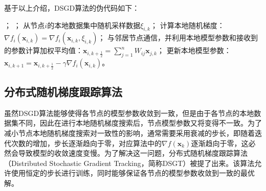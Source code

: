 基于以上介绍，DSGD算法的伪代码如下：
\begin{center}
    \begin{algorithm}[!htbp]
            \caption{节点$i$上的DSGD算法} 
            \label{Algorithm-DSGD} 
            \begin{algorithmic}[1]
            ；
            ；
                \STATE 从节点$i$的本地数据集中随机采样数据$\xi _{i,k} $；
                \STATE 计算本地随机梯度：$\nabla f_i\left( \boldsymbol{x}_{i,k} \right) =\nabla f_i\left( \boldsymbol{x}_{i,k},\xi _{i,k} \right) $；
                \STATE 与邻居节点通信，并利用本地模型参数和接收到的参数计算加权平均值：$\boldsymbol{x}_{i,k+\frac{1}{2}}=\sum_{j=1}^n{W_{ij}\boldsymbol{x}_{j,k}}$；
                \STATE 更新本地模型参数：$\boldsymbol{x}_{i,k+1}=\boldsymbol{x}_{i,k+\frac{1}{2}}-\gamma \nabla f_i\left( \boldsymbol{x}_{i,k} \right) $。
            \ENDFOR            
            \end{algorithmic}
    \end{algorithm}
\end{center}

\subsection{分布式随机梯度跟踪算法}
虽然DSGD算法能够使得各节点的模型参数收敛到一致，但是由于各节点的本地数据集不同，因此在进行本地随机梯度搜索后，节点模型参数又将变得不一致。为了减小节点本地随机梯度搜索对一致性的影响，通常需要采用衰减的步长，即随着迭代次数的增加，步长逐渐趋向于零，对应算法中的$\nabla f\left( \boldsymbol{x}_k \right)$逐渐趋向于零，这必然会导致模型的收敛速度变慢。为了解决这一问题，分布式随机梯度跟踪算法（Distributed Stochastic Gradient Tracking，简称DSGT）被提了出来。该算法允许使用恒定的步长进行训练，同时能够保证各节点的模型参数收敛到一致的最优解。

